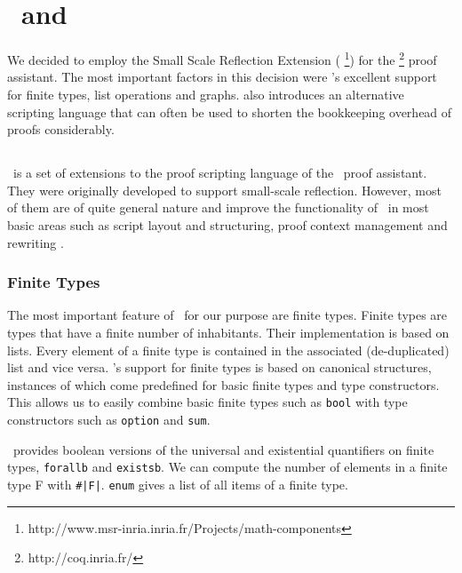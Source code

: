 \chapter{\coq\ and \ssreflect}
\label{chap:coq}


We decided to employ the Small Scale Reflection Extension (\textbf{\ssreflect}%
\footnote{http://www.msr-inria.inria.fr/Projects/math-components})
for the \textbf{\coq}%
\footnote{http://coq.inria.fr/}
proof assistant. 
The most important factors in this decision were \ssreflect's excellent support for finite types, list operations and graphs. \ssreflect{} also introduces an alternative scripting language that can often be used to shorten the bookkeeping overhead of proofs considerably.

\section{\coq}



\section{\ssreflect}


\ssreflect\ is a set of extensions to the proof scripting language of the \coq\ proof assistant. 
They were originally developed to support small-scale reflection. 
However, most of them are of quite general nature and improve the functionality of \coq\ in most basic areas such as script layout and structuring, proof context management and rewriting \cite{gonthier:inria-00258384}.


\subsection{Finite Types} %

The most important feature of \ssreflect\ for our purpose are finite types. 
Finite types are types that have a finite number of inhabitants.
Their implementation is based on lists.
Every element of a finite type is contained in the associated (de-duplicated) list and vice versa.
\ssreflect's support for finite types is based on canonical structures, instances of which come predefined for basic finite types and type constructors. 
This allows us to easily combine basic finite types such as \lstinline{bool} with type constructors such as \lstinline{option} and \lstinline{sum}. 

\ssreflect\ provides boolean versions of the universal and existential quantifiers on finite types, \lstinline{forallb} and \lstinline{existsb}.
We can compute the number of elements in a finite type F with \lstinline{#|F|}.
\lstinline{enum} gives a list of all items of a finite type. 


